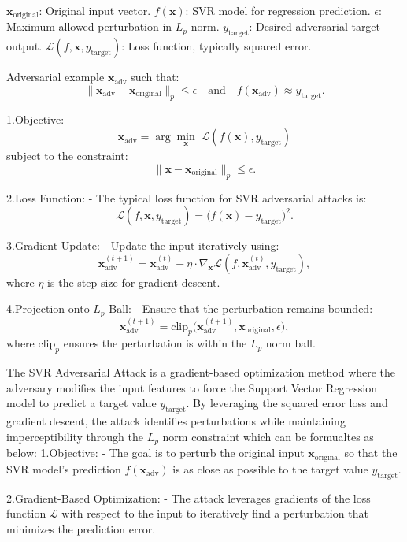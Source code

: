 $\mathbf{x}_{\text{original}}$: Original input vector.
$f(\mathbf{x})$: SVR model for regression prediction.
$\epsilon$: Maximum allowed perturbation in $L_p$ norm.
$y_{\text{target}}$: Desired adversarial target output.
$\mathcal{L}(f, \mathbf{x}, y_{\text{target}})$: Loss function, typically squared error.

Adversarial example $\mathbf{x}_{\text{adv}}$ such that:
  \[
  \|\mathbf{x}_{\text{adv}} - \mathbf{x}_{\text{original}}\|_p \leq \epsilon \quad \text{and} \quad f(\mathbf{x}_{\text{adv}}) \approx y_{\text{target}}.
  \]

1.Objective:
   \[
   \mathbf{x}_{\text{adv}} = \arg \min_{\mathbf{x}} \; \mathcal{L}(f(\mathbf{x}), y_{\text{target}})
   \]
   subject to the constraint:
   \[
   \|\mathbf{x} - \mathbf{x}_{\text{original}}\|_p \leq \epsilon.
   \]

2.Loss Function:
   - The typical loss function for SVR adversarial attacks is:
     \[
     \mathcal{L}(f, \mathbf{x}, y_{\text{target}}) = \big(f(\mathbf{x}) - y_{\text{target}}\big)^2.
     \]

3.Gradient Update:
   - Update the input iteratively using:
     \[
     \mathbf{x}_{\text{adv}}^{(t+1)} = \mathbf{x}_{\text{adv}}^{(t)} - \eta \cdot \nabla_{\mathbf{x}} \mathcal{L}(f, \mathbf{x}_{\text{adv}}^{(t)}, y_{\text{target}}),
     \]
     where $\eta$ is the step size for gradient descent.

4.Projection onto $L_p$ Ball:
   - Ensure that the perturbation remains bounded:
     \[
     \mathbf{x}_{\text{adv}}^{(t+1)} = \text{clip}_p \big(\mathbf{x}_{\text{adv}}^{(t+1)}, \mathbf{x}_{\text{original}}, \epsilon \big),
     \]
     where $\text{clip}_p$ ensures the perturbation is within the $L_p$ norm ball.

The SVR Adversarial Attack is a gradient-based optimization method where the adversary modifies the input features to force the Support Vector Regression model to predict a target value $y_{\text{target}}$. By leveraging the squared error loss and gradient descent, the attack identifies perturbations while maintaining imperceptibility through the $L_p$ norm constraint which can be formualtes as below:
1.Objective:
   - The goal is to perturb the original input $\mathbf{x}_{\text{original}}$ so that the SVR model's prediction $f(\mathbf{x}_{\text{adv}})$ is as close as possible to the target value $y_{\text{target}}$.

2.Gradient-Based Optimization:
   - The attack leverages gradients of the loss function $\mathcal{L}$ with respect to the input to iteratively find a perturbation that minimizes the prediction error.

